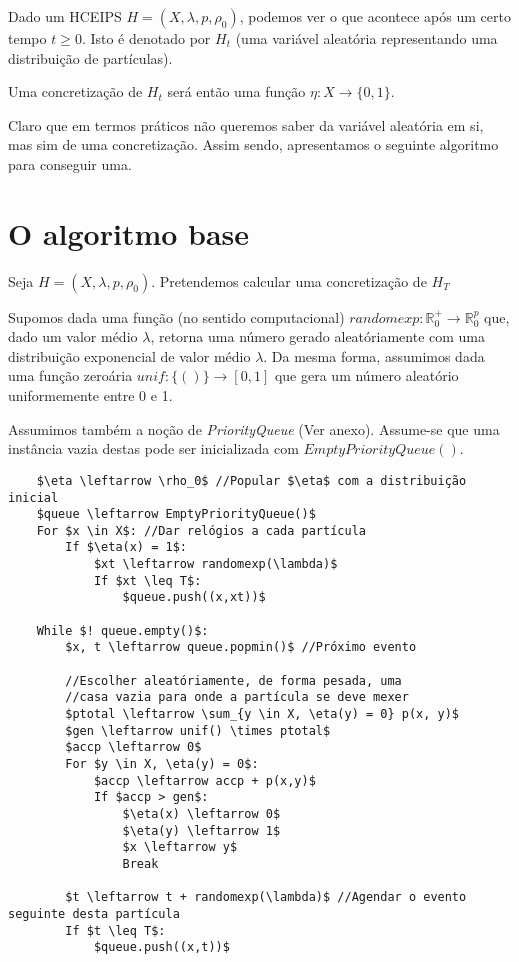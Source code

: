 \documentclass{article}
\newcommand{\R}{\mathbb{R}}
\begin{document}
	Dado um HCEIPS $H = (X, \lambda, p, \rho_0)$, podemos ver o que acontece após um certo tempo $t \geq 0$. Isto é denotado por $H_t$ (uma variável aleatória representando uma distribuição de partículas).
	
	Uma concretização de $H_t$ será então uma função $\eta : X \rightarrow \{0,1\}$.
	
	Claro que em termos práticos não queremos saber da variável aleatória em si, mas sim de uma concretização. Assim sendo, apresentamos o seguinte algoritmo para conseguir uma.
	
	\section{O algoritmo base}
	
	Seja $H = (X, \lambda, p, \rho_0)$. Pretendemos calcular uma concretização de $H_T$
	
	Supomos dada uma função (no sentido computacional) $randomexp : \R^+_0 \rightarrow \R^p_0$ que, dado um valor médio $\lambda$, retorna uma número gerado aleatóriamente com uma distribuição exponencial de valor médio $\lambda$. Da mesma forma, assumimos dada uma função zeroária $unif : \{()\} \rightarrow [0,1]$ que gera um número aleatório uniformemente entre 0 e 1.
	
	Assumimos também a noção de \emph{PriorityQueue} (Ver anexo). Assume-se que uma instância vazia destas pode ser inicializada com $EmptyPriorityQueue()$.
	
	\begin{minipage}{\linewidth}
	\begin{lstlisting}
	$\eta \leftarrow \rho_0$ //Popular $\eta$ com a distribuição inicial
	$queue \leftarrow EmptyPriorityQueue()$
	For $x \in X$: //Dar relógios a cada partícula
		If $\eta(x) = 1$:
			$xt \leftarrow randomexp(\lambda)$
			If $xt \leq T$:
				$queue.push((x,xt))$

	While $! queue.empty()$:
		$x, t \leftarrow queue.popmin()$ //Próximo evento
		
		//Escolher aleatóriamente, de forma pesada, uma
		//casa vazia para onde a partícula se deve mexer
		$ptotal \leftarrow \sum_{y \in X, \eta(y) = 0} p(x, y)$
		$gen \leftarrow unif() \times ptotal$
		$accp \leftarrow 0$
		For $y \in X, \eta(y) = 0$:
			$accp \leftarrow accp + p(x,y)$
			If $accp > gen$:
				$\eta(x) \leftarrow 0$
				$\eta(y) \leftarrow 1$
				$x \leftarrow y$
				Break
		
		$t \leftarrow t + randomexp(\lambda)$ //Agendar o evento seguinte desta partícula
		If $t \leq T$:
			$queue.push((x,t))$
	\end{lstlisting}
	\end{minipage}
	
\end{document}
